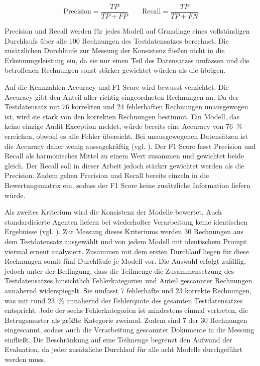 \begin{equation}
    \text{Precision} = \frac{TP}{TP + FP} \qquad \text{Recall} = \frac{TP}{TP + FN}
\end{equation}

Precision und Recall werden für jedes Modell auf Grundlage eines vollständigen Durchlaufs über alle 100 Rechnungen des Testdatensatzes berechnet. Die zusätzlichen Durchläufe zur Messung der Konsistenz fließen nicht in die Erkennungsleistung ein, da sie nur einen Teil des Datensatzes umfassen und die betroffenen Rechnungen sonst stärker gewichtet würden als die übrigen.

Auf die Kennzahlen Accuracy und F1 Score wird bewusst verzichtet. Die Accuracy gibt den Anteil aller richtig eingeordneten Rechnungen an. Da der Testdatensatz mit 76 korrekten und 24 fehlerhaften Rechnungen unausgewogen ist, wird sie stark von den korrekten Rechnungen bestimmt. Ein Modell, das keine einzige Audit Exception meldet, würde bereits eine Accuracy von 76~\% erreichen, obwohl es alle Fehler übersieht. Bei unausgewogenen Datensätzen ist die Accuracy daher wenig aussagekräftig (vgl. \cite[S.~1276\,f.]{he2009imbalanced}). Der F1 Score fasst Precision und Recall als harmonisches Mittel zu einem Wert zusammen und gewichtet beide gleich. Der Recall soll in dieser Arbeit jedoch stärker gewichtet werden als die Precision. Zudem gehen Precision und Recall bereits einzeln in die Bewertungsmatrix ein, sodass der F1 Score keine zusätzliche Information liefern würde.

Als zweites Kriterium wird die Konsistenz der Modelle bewertet. Auch standardisierte Agenten liefern bei wiederholter Verarbeitung keine identischen Ergebnisse (vgl. \cite[S.~142]{atil2025}). Zur Messung dieses Kriteriums werden 30 Rechnungen aus dem Testdatensatz ausgewählt und von jedem Modell mit identischem Prompt viermal erneut analysiert. Zusammen mit dem ersten Durchlauf liegen für diese Rechnungen somit fünf Durchläufe je Modell vor. Die Auswahl erfolgt zufällig, jedoch unter der Bedingung, dass die Teilmenge die Zusammensetzung des Testdatensatzes hinsichtlich Fehlerkategorien und Anteil gescannter Rechnungen annähernd widerspiegelt. Sie umfasst 7 fehlerhafte und 23 korrekte Rechnungen, was mit rund 23~\% annähernd der Fehlerquote des gesamten Testdatensatzes entspricht. Jede der sechs Fehlerkategorien ist mindestens einmal vertreten, die Betrugsmuster als größte Kategorie zweimal. Zudem sind 7 der 30 Rechnungen eingescannt, sodass auch die Verarbeitung gescannter Dokumente in die Messung einfließt. Die Beschränkung auf eine Teilmenge begrenzt den Aufwand der Evaluation, da jeder zusätzliche Durchlauf für alle acht Modelle durchgeführt werden muss.

